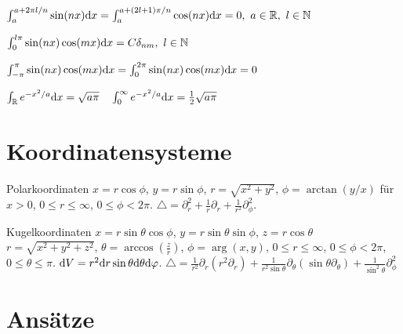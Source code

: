 $\int_{a}^{a+2\pi l/n} \sin(nx)\mathrm{d} x = \int_{a}^{a+(2l+1)\pi/n} \cos(nx)\mathrm{d} x = 0,\ a\in\mathbb{R},\ l\in\mathbb{N}$

$\int_0^{l\pi} \sin(nx)\cos(mx)\mathrm{d}x = C\delta_{nm},\ l\in\mathbb{N}$

$\int_{-\pi}^{\pi} \sin(nx)\cos(mx)\mathrm{d} x = \int_{0}^{2\pi} \sin(nx)\cos(mx)\mathrm{d} x = 0$
  
$\int_{\mathbb{R}}e^{-x^2/a}\mathrm{d}x = \sqrt{a\pi} \quad \int_{0}^{\infty}e^{-x^2/a}\mathrm{d}x= \frac12\sqrt{a\pi}$ 





\section{Koordinatensysteme}

\begin{namedtheorem}{Polarkoordinaten}
  $x=r\cos\phi$, $y=r\sin\phi$, $r=\sqrt{x^2+y^2}$, $\phi=\arctan(y/x)$ für $x>0$, $0\leq r\leq\infty$, $0\leq\phi<2\pi$. $\triangle = \partial_r^2+\frac1r\partial_r+\frac1{r^2}\partial_{\phi}^2$.
\end{namedtheorem}

\begin{namedtheorem}{Kugelkoordinaten}
  $x=r\sin\theta\cos\phi$, $y=r\sin\theta\sin\phi$, $z=r\cos\theta$\\
  $r=\sqrt{x^2+y^2+z^2}$, $\theta=\arccos\left(\frac{z}{r}\right)$, $\phi=\arg(x,y)$, $0\leq r \leq \infty$, $0\leq\phi<2\pi$, $0\leq\theta\leq\pi$. $\mathrm{d} V = r^2\mathrm{d} r \sin\theta \mathrm{d} \theta \mathrm{d}\varphi$. $\triangle = \frac1{r^2}\partial_r(r^2\partial_r)+\frac1{r^2\sin\theta}\partial_{\theta}(\sin\theta\partial_{\theta})+\frac1{\sin^2\theta}\partial_{\phi}^2$
\end{namedtheorem}

\section{Ansätze}

